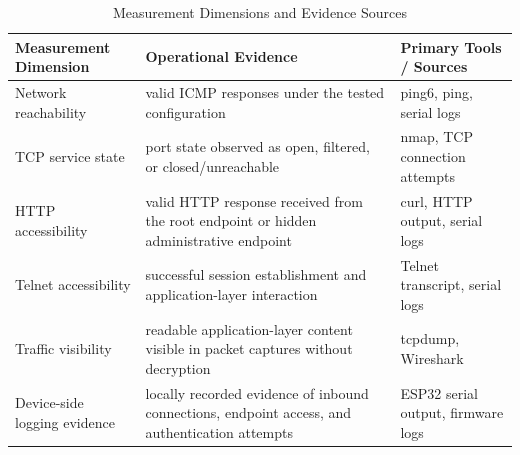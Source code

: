 \begin{table}[H]
    \centering
    \caption{Measurement Dimensions and Evidence Sources}
    \label{tab:measurement-dimensions}
    \begin{tabularx}{\textwidth}{L L L}
        \toprule
        \textbf{\color{white}Measurement Dimension} & \textbf{\color{white}Operational Evidence} & \textbf{\color{white}Primary Tools / Sources} \\
        \midrule
        Network reachability & valid ICMP responses under the tested configuration & ping6, ping, serial logs \\
        TCP service state & port state observed as open, filtered, or closed/unreachable & nmap, TCP connection attempts \\
        HTTP accessibility & valid HTTP response received from the root endpoint or hidden administrative endpoint & curl, HTTP output, serial logs \\
        Telnet accessibility & successful session establishment and application-layer interaction & Telnet transcript, serial logs \\
        Traffic visibility & readable application-layer content visible in packet captures without decryption & tcpdump, Wireshark \\
        Device-side logging evidence & locally recorded evidence of inbound connections, endpoint access, and authentication attempts & ESP32 serial output, firmware logs \\
        \bottomrule
    \end{tabularx}
\end{table}
